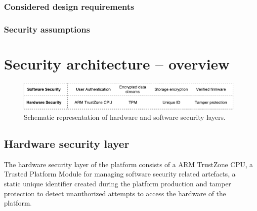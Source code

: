 \documentclass[10pt]{article}
\begin{document}
      \subsubsection{Considered design requirements}


      \subsubsection{Security assumptions}

         \begin{itemize}
         \end{itemize}

  \section{Security architecture -- overview}

    \begin{figure}[!h]
      \center
      \includegraphics[width=\textwidth]{input/security_layers.pdf}
      \caption{Schematic representation of hardware and software security layers.}
    \end{figure}

    \subsection{Hardware security layer}

      The hardware security layer of the platform consists of a ARM TrustZone
      CPU, a Trusted Platform Module for managing software security related
      artefacts, a static unique identifier created during the platform
      production and tamper protection to detect unauthorized attempts to
      access the hardware of the platform.
\end{document}
